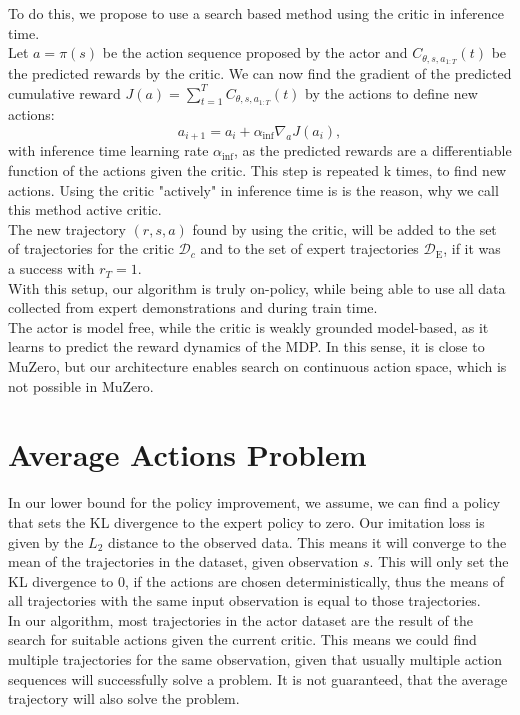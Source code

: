 To do this, we propose to use 
a search based method using the critic in inference time. \\

Let $a = \pi(s)$ be the action sequence proposed by the actor and $C_{\theta, s, a_{1:T}}(t)$ be the predicted rewards by the critic. 
We can now find the gradient of the predicted cumulative reward $J(a) = \sum_{t=1}^{T} C_{\theta, s, a_{1:T}}(t)$ by the actions to define new actions: 
$$a_{i+1} = a_i + \alpha_{\mathrm{inf}} \nabla_{a} J(a_i),$$ 
with inference time learning rate $\alpha_{\mathrm{inf}}$, as the predicted rewards are a differentiable function of the actions given the critic. This step is repeated k times, to find new actions. 
Using the critic "actively" in inference time is is the reason, why we call this method active critic.\\ 

The new trajectory $(r, s, a)$ found by using the critic, will 
be added to the set of trajectories for the critic $\mathcal{D}_c$ and to the set of expert trajectories $\mathcal{D}_{\text{E}}$, if it was a success with $r_T = 1$. \\

With this setup, our algorithm is truly on-policy, while being able to use all data collected from expert demonstrations and during train time. \\

The actor is model free, while the critic is weakly grounded model-based, as it learns to predict the reward dynamics of the MDP. In this sense, it is close to MuZero, 
but our architecture enables search on continuous action space, which is not possible in MuZero. 

\section{Average Actions Problem}
\label{avr_action_problem}
In our lower bound for the policy improvement, we assume, we can find a policy that sets the KL divergence to the expert policy to zero. Our imitation loss is given by the $L_2$ distance to the 
observed data. This means it will converge to the mean of the trajectories in the dataset, given observation $s$. This will only set the KL divergence to 0, if the actions are chosen deterministically, 
thus the means of all trajectories with the same input observation is equal to those trajectories.\\

In our algorithm, most trajectories in the actor dataset are the result of the search for suitable actions given the current critic. This means we could find
multiple trajectories for the same observation, given that usually multiple action sequences will successfully solve a problem. It is not guaranteed, that the 
average trajectory will also solve the problem.\\ 

